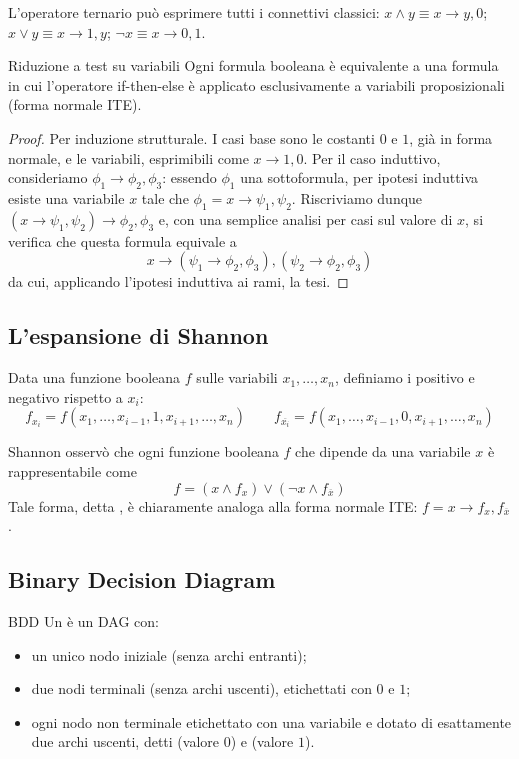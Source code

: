 L'operatore ternario può esprimere tutti i connettivi classici: \(x \land y \equiv x \to y,0\); \(x \lor y \equiv x \to 1,y\); \(\neg x \equiv x \to 0,1\).

\begin{proposition}{Riduzione a test su variabili}
  Ogni formula booleana è equivalente a una formula in cui l'operatore if-then-else è applicato esclusivamente a variabili proposizionali (forma normale ITE).
\end{proposition}
\begin{proof}
  Per induzione strutturale. I casi base sono le costanti \(0\) e \(1\), già in forma normale, e le variabili, esprimibili come \(x\to 1,0\). Per il caso induttivo, consideriamo \(\phi_1 \to \phi_2,\phi_3\): essendo \(\phi_1\) una sottoformula, per ipotesi induttiva esiste una variabile \(x\) tale che \(\phi_1 = x \to \psi_1,\psi_2\). Riscriviamo dunque \((x \to \psi_1,\psi_2) \to \phi_2,\phi_3\) e, con una semplice analisi per casi sul valore di \(x\), si verifica che questa formula equivale a
  \[x\to(\psi_1\to\phi_2,\phi_3),(\psi_2\to\phi_2,\phi_3)\]
  da cui, applicando l'ipotesi induttiva ai rami, la tesi.
\end{proof}

\subsection{L'espansione di Shannon}

Data una funzione booleana \(f\) sulle variabili \(x_1,\dots,x_n\), definiamo i  positivo e negativo rispetto a \(x_i\):
\[f_{x_i} = f(x_1, \ldots, x_{i-1}, 1, x_{i+1}, \ldots, x_n) \qquad f_{\overline{x_i}} = f(x_1, \ldots, x_{i-1}, 0, x_{i+1}, \ldots, x_n)\]

Shannon osservò che ogni funzione booleana \(f\) che dipende da una variabile \(x\) è rappresentabile come
\[f = (x\land f_{x}) \lor (\neg x \land f_{\overline{x}})\]
Tale forma, detta , è chiaramente analoga alla forma normale ITE: \(f = x \to f_x, f_{\overline{x}}\).

\subsection{Binary Decision Diagram}

\begin{definition}{BDD}
  Un  è un DAG con:
  \begin{itemize}
    \item un unico nodo iniziale (senza archi entranti);
    \item due nodi terminali (senza archi uscenti), etichettati con \(0\) e \(1\);
    \item ogni nodo non terminale etichettato con una variabile e dotato di esattamente due archi uscenti, detti  (valore \(0\)) e  (valore \(1\)).
  \end{itemize}
\end{definition}

